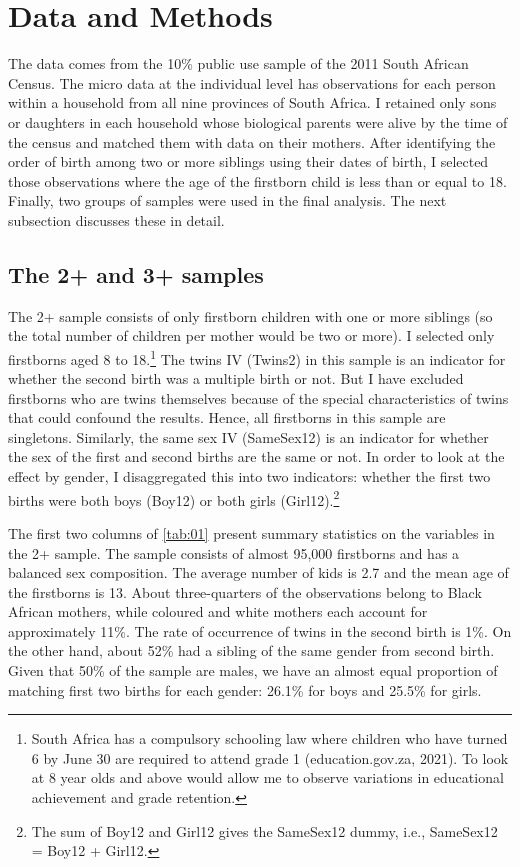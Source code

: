 
\section*{Data and Methods}

The data comes from the 10\% public use sample of the 2011 South African Census. The micro data at the individual level has observations for each person within a household from all nine provinces of South Africa. I retained only sons or daughters in each household whose biological parents were alive by the time of the census and matched them with data on their mothers. After identifying the order of birth among two or more siblings using their dates of birth, I selected those observations where the age of the firstborn child is less than or equal to 18. Finally, two groups of samples were used in the final analysis. The next subsection discusses these in detail.

\subsection*{The 2+ and 3+ samples}

The 2+ sample consists of only firstborn children with one or more siblings (so the total number of children per mother would be two or more). I selected only firstborns aged 8 to 18.\footnote{ South Africa has a compulsory schooling law where children who have turned 6 by June 30 are required to attend grade 1 (education.gov.za, 2021). To look at 8 year olds and above would allow me to observe variations in educational achievement and grade retention. } The twins IV (Twins2) in this sample is an indicator for whether the second birth was a multiple birth or not. But I have excluded firstborns who are twins themselves because of the special characteristics of twins that could confound the results. Hence, all firstborns in this sample are singletons. Similarly, the same sex IV (SameSex12) is an indicator for whether the sex of the first and second births are the same or not. In order to look at the effect by gender, I disaggregated this into two indicators: whether the first two births were both boys (Boy12) or both girls (Girl12).\footnote{The sum of Boy12 and Girl12 gives the SameSex12 dummy, i.e., SameSex12 = Boy12 + Girl12.}

The first two columns of \autoref{tab:01} present summary statistics on the variables in the 2+ sample. The sample consists of almost 95,000 firstborns and has a balanced sex composition. The average number of kids is 2.7 and the mean age of the firstborns is 13. About three-quarters of the observations belong to Black African mothers, while coloured and white mothers each account for approximately 11\%. The rate of occurrence of twins in the second birth is 1\%. On the other hand, about 52\% had a sibling of the same gender from second birth. Given that 50\% of the sample are males, we have an almost equal proportion of matching first two births for each gender: 26.1\% for boys and 25.5\% for girls. 

